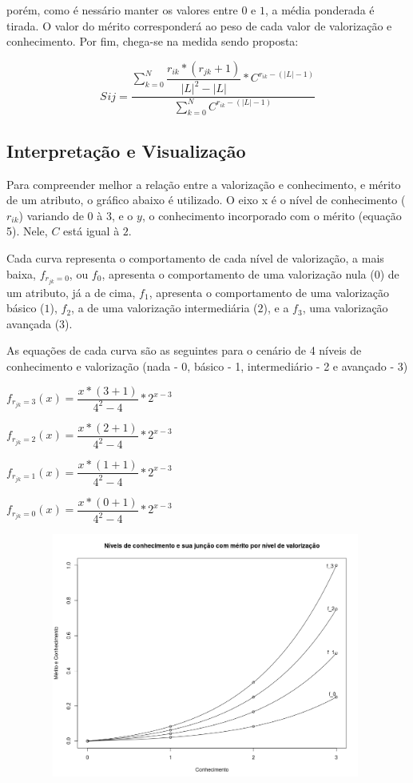 \documentclass[]{article}
\begin{document}
	
	porém, como é nessário manter os valores entre $0$ e $1$, a média ponderada é tirada. O valor do mérito corresponderá ao peso de cada valor de valorização e conhecimento. Por fim, chega-se na medida sendo proposta:
	
	\begin{center}
		\begin{equation}
			S_{}ij = \dfrac{\sum_{k = 0}^N \dfrac{r_{ik}*(r_{jk} + 1)}{|L|^2 - |L|} * C^{r_{ik} - (|L| - 1)}}{\sum_{k = 0}^N C^{r_{ik} - (|L| - 1)}}
		\end{equation}	
	\end{center}
	
	\subsection{Interpretação e Visualização}
	
	Para compreender melhor a relação entre a valorização e conhecimento, e mérito de um atributo, o gráfico abaixo é utilizado. O eixo x é o nível de conhecimento ($r_{ik}$) variando de $0$ à $3$, e o $y$, o conhecimento incorporado com o mérito (equação 5). Nele, $C$ está igual à $2$.
	
	Cada curva representa o comportamento de cada nível de valorização, a mais baixa, $f_{r_{jk} = 0}$, ou $f_0$, apresenta o comportamento de uma valorização nula ($0$) de um atributo, já a de cima, $f_1$, apresenta o comportamento de uma valorização básico ($1$), $f_2$, a de uma valorização intermediária ($2$), e a $f_3$, uma valorização avançada ($3$).
	
	As equações de cada curva são as seguintes para o cenário de 4 níveis de conhecimento e valorização (nada - 0, básico - 1, intermediário - 2 e avançado - 3)
	
	\begin{center}
		$ f_{r_{jk} = 3}(x) = \dfrac{x*(3 + 1)}{4^2 - 4} * 2^{x - 3} $
		
		$ f_{r_{jk} = 2}(x) = \dfrac{x*(2 + 1)}{4^2 - 4} * 2^{x - 3} $
		
		$ f_{r_{jk} = 1}(x) = \dfrac{x*(1 + 1)}{4^2 - 4} * 2^{x - 3} $
		
		$ f_{r_{jk} = 0}(x) = \dfrac{x*(0 + 1)}{4^2 - 4} * 2^{x - 3} $
	\end{center}
	\includegraphics[width=13.2cm, height=8cm]{plot}
	
\end{document}
